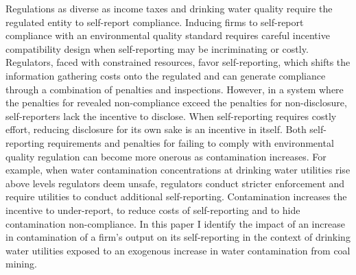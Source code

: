 \documentclass{article}
\begin{document}
Regulations as diverse as income taxes and drinking water quality require the regulated entity to self-report compliance. Inducing firms to self-report compliance with an environmental quality standard requires careful incentive compatibility design when self-reporting may be incriminating or costly. Regulators, faced with constrained resources, favor self-reporting, which shifts the information gathering costs onto the regulated and can generate compliance through a combination of penalties and inspections. However, in a system where the penalties for revealed non-compliance exceed the penalties for non-disclosure, self-reporters lack the incentive to disclose. When self-reporting requires costly effort, reducing disclosure for its own sake is an incentive in itself. Both self-reporting requirements and penalties for failing to comply with environmental quality regulation can become more onerous as contamination increases. For example, when water contamination concentrations at drinking water utilities rise above levels regulators deem unsafe, regulators conduct stricter enforcement and require utilities to conduct additional self-reporting. Contamination increases the incentive to under-report, to reduce costs of self-reporting and to hide contamination non-compliance. In this paper I identify the impact of an increase in contamination of a firm's output on its self-reporting in the context of drinking water utilities exposed to an exogenous increase in water contamination from coal mining.
\end{document}
